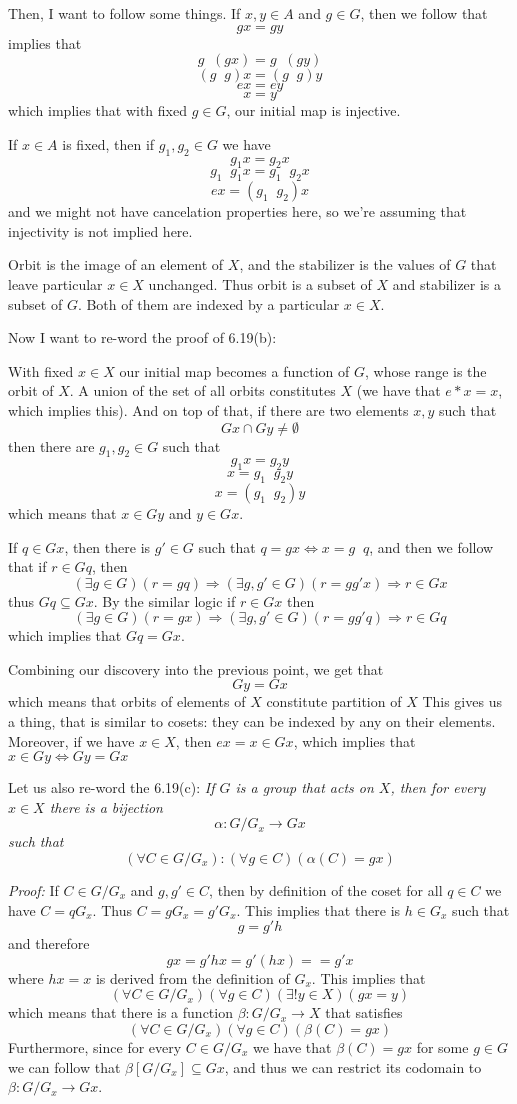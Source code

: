 \documentclass[11pt,oneside,titlepage]{book}
\DeclareMathOperator \inv {^{-1}}
\DeclareMathOperator \lra {\Leftrightarrow}
\DeclareMathOperator \ra {\Rightarrow}
\begin{document}
Then, I want to follow some things. If $x, y \in A$ and $g \in G$,
then we follow that
$$gx = gy$$
implies that
$$g\inv (g x) = g\inv (gy)$$
$$(g\inv g) x = (g\inv g)y$$
$$e x = e y$$
$$x = y$$
which implies that with fixed $g \in G$, our initial map is injective.

If $x \in A$ is fixed, then if $g_1, g_2 \in G$ we have
$$g_1 x = g_2 x$$
$$g_1 \inv g_1 x = g_1 \inv g_2 x$$
$$e x = (g_1 \inv g_2) x$$
and we might not have cancelation properties here, so we're assuming
that injectivity is not implied here.

Orbit is the image of an element of $X$, and the stabilizer is
the values of $G$ that leave particular $x \in X$ unchanged. 
Thus orbit is a subset of $X$ and stabilizer is a subset of $G$.
Both of them are indexed by a particular $x \in X$.

Now I want to re-word the proof of 6.19(b):

With fixed $x \in X$ our initial map becomes a function of $G$,
whose range is the orbit of $X$. A union of the set of all orbits
constitutes $X$ (we have that $e * x = x$, which implies this).
And on top of that, if there are two elements $x, y$ such that
$$Gx \cap Gy \neq \emptyset$$
then there are $g_1, g_2 \in G$ such that
$$g_1 x = g_2 y$$
$$ x = g_1 \inv g_2 y$$
$$ x = (g_1 \inv g_2) y$$
which means that $x \in Gy$ and $y \in Gx$.

If $q \in Gx$, then there is $g' \in G$ such that
$q = gx \lra x = g\inv q$, and then we follow that if $r \in Gq$, then
$$(\exists g \in G) (r = gq) \ra (\exists g, g' \in G) (r = gg'x) \ra r \in Gx$$
thus $Gq \subseteq Gx$. By the similar logic if $r \in Gx$ then
$$(\exists g \in G) (r = gx) \ra (\exists g, g' \in G) (r = gg'q) \ra r \in Gq$$
which implies that $Gq = Gx$.

Combining our discovery into the previous point, we get that
$$Gy = Gx$$
which means that orbits of elements of $X$ constitute partition of $X$
This gives us a thing, that is similar to cosets: they can be indexed
by any on their elements. Moreover, if we have $x \in X$, then
$ex = x  \in Gx$, which implies that $x \in Gy \iff Gy = Gx$

Let us also re-word the 6.19(c): \textit{If $G$ is a group that acts
on $X$, then for every $x \in X$ there is a bijection
$$\alpha: G/G_x \to Gx$$
such that
$$(\forall C \in G/G_x): (\forall g \in C)(\alpha(C) = gx)$$}

\textit{Proof: } If $C \in G/G_x$ and $g, g' \in C$, then by definition of
the coset for all $q \in C$ we have $C = qG_x$. Thus
$C = gG_x = g'G_x$. This implies that there is $h \in G_x$
such that
$$g = g' h$$
and therefore
$$gx = g' h x = g' (h x) =  = g'x$$
where $hx = x$ is derived from the definition of $G_x$.
This implies that
$$(\forall C \in G/G_x)(\forall g \in C)(\exists !  y \in X)(gx = y)$$
which means that there is a function $\beta: G/G_x \to X$ that satisfies
$$(\forall C \in G/G_x)( \forall g \in C)(\beta(C) = gx)$$
Furthermore, since for every $C \in G/G_x$ we have that $\beta(C) = gx$
for some $g \in G$ we can follow that $\beta[G/G_x] \subseteq Gx$,
and thus we can restrict its codomain to $\beta: G/G_x \to Gx$.
\end{document}
